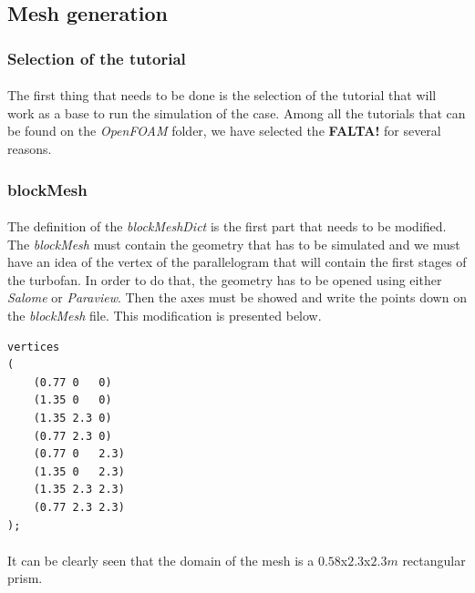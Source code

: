 \subsection{Mesh generation}

\subsubsection{Selection of the tutorial}

\paragraph{}The first thing that needs to be done is the selection of the tutorial that will work as a base to run the simulation of the case. Among all the tutorials that can be found on the \textit{OpenFOAM} folder, we have selected the \textbf{FALTA!} for several reasons.

\subsubsection{blockMesh}

\paragraph{}The definition of the \textit{blockMeshDict} is the first part that needs to be modified. The \textit{blockMesh} must contain the geometry that has to be simulated and we must have an idea of the vertex of the parallelogram that will contain the first stages of the turbofan. In order to do that, the geometry has to be opened using either \textit{Salome} or \textit{Paraview}. Then the axes must be showed and write the points down on the \textit{blockMesh} file. This modification is presented below.

\begin{footnotesize}
\begin{verbatim}
vertices
(
    (0.77 0   0)
    (1.35 0   0)
    (1.35 2.3 0)
    (0.77 2.3 0)
    (0.77 0   2.3)
    (1.35 0   2.3)
    (1.35 2.3 2.3)
    (0.77 2.3 2.3)
);
\end{verbatim}
\end{footnotesize}

\paragraph{}It can be clearly seen that the domain of the mesh is a $0.58$x$2.3$x$2.3m$ rectangular prism.

